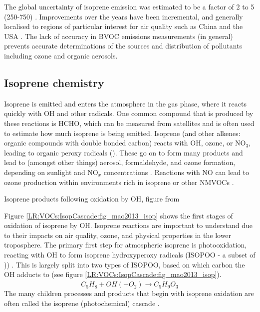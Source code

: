     The global uncertainty of isoprene emission was estimated to be a factor of 2 to 5 (250-750\tgpyr) \parencite{Kanakidou2005}.
    Improvements over the years have been incremental, and generally localised to regions of particular interest for air quality such as China and the USA \parencite{Guenther2012,Jiang2018}.
    The lack of accuracy in BVOC emissions measurements (in general) prevents accurate determinations of the sources and distribution of pollutants including ozone and organic aerosols.
    
  \subsection{Isoprene chemistry}
    \label{LR:VOCs:IsopCascade}
    
    Isoprene is emitted and enters the atmosphere in the gas phase, where it reacts quickly with OH and other radicals.
    One common compound that is produced by these reactions is HCHO, which can be measured from satellites and is often used to estimate how much isoprene is being emitted.
    Isoprene (and other alkenes: organic compounds with double bonded carbon) reacts with OH, ozone, or NO$_3$, leading to organic peroxy radicals (\roo).
    These go on to form many products and lead to (amongst other things) aerosol, formaldehyde, and ozone formation, depending on sunlight and NO$_x$ concentrations \parencite{Atkinson2000}.
    Reactions with NO can lead to ozone production within environments rich in isoprene or other NMVOCs \parencite{Patchen2007,AtkinsonArey2003}.
    
      {Isoprene products following oxidation by OH, figure from \textcite{Mao2013}}
      {\label{LR:VOCs:IsopCascade:fig_mao2013_isop}}
    
    Figure \ref{LR:VOCs:IsopCascade:fig_mao2013_isop} shows the first stages of oxidation of isoprene by OH.
    Isoprene reactions are important to understand due to their impacts on air quality, ozone, and physical properties in the lower troposphere.
    The primary first step for atmospheric isoprene is photooxidation, reacting with OH to form isoprene hydroxyperoxy radicals (ISOPOO - a subset of \roo)) \parencite{Patchen2007,Wolfe2016,Marvin2017}.
    This is largely split into two types of ISOPOO, based on which carbon the OH adducts to (see figure \ref{LR:VOCs:IsopCascade:fig_mao2013_isop}).
    \begin{equation} \label{LR:VOCs:IsopCascade:eqn_IsopToIsopoo}
    C_5H_8 + OH (+ O_2) \rightarrow \dot{C_5H_9O_3}
    \end{equation}
    The many children processes and products that begin with isoprene oxidation are often called the isoprene (photochemical) cascade \parencite[eg.][]{Crounse2012,Paulot2012,Wolfe2016}.
    
